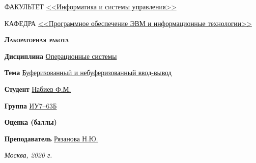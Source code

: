 \begin{titlepage}
    \begin{flushleft}
        \small
        ФАКУЛЬТЕТ \uline{<<Информатика и системы управления>> \hfill} \par
        \vspace{0.25cm}
        КАФЕДРА \uline{<<Программное обеспечение ЭВМ и информационные технологии>> \hfill} \par
    \end{flushleft}

    \vspace{4cm}

    {\LARGE\scshape\bfseries
        Лабораторная работа 
    }

    \vspace{2cm}

    \begin{flushleft}
        \large
        \begin{minipage}[t]{0.8\linewidth}
            \textbf{Дисциплина }\uline{\hfill Операционные системы \hfill} \par
            \vspace{0.25cm}
            \textbf{Тема }\uline{\hfill{\small Буферизованный и небуферизованный ввод-вывод} \hfill} \par
        \end{minipage}

        \vspace{1cm}

        \begin{minipage}[t]{0.6\linewidth}
            \textbf{Студент }\uline{\hfill Набиев Ф.М. \hfill} \par
            \vspace{0.25cm}
            \textbf{Группа }\uline{\hfill ИУ7--63Б \hfill} \par
            \vspace{0.25cm}
            \textbf{Оценка (баллы) }\uline{\hfill \hfill} \par
            \vspace{0.25cm}
            \textbf{Преподаватель }\uline{\hfill Рязанова Н.Ю. \hfill} \par
        \end{minipage}

    \end{flushleft}

    \vfill

    \it
    Москва, 2020 г.

\end{titlepage}

